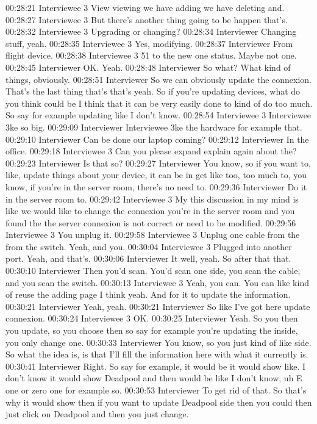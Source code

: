00:28:21 Interviewee 3
View viewing we have adding we have deleting and.
00:28:27 Interviewee 3
But there's another thing going to be happen that's.
00:28:32 Interviewee 3
Upgrading or changing?
00:28:34 Interviewer
Changing stuff, yeah.
00:28:35 Interviewee 3
Yes, modifying.
00:28:37 Interviewer
From flight device.
00:28:38 Interviewee 3
51 to the new one status. Maybe not one.
00:28:45 Interviewer
OK. Yeah.
00:28:48 Interviewer
So what? What kind of things, obviously.
00:28:51 Interviewer
So we can obviously update the connexion. That's the last thing that's that's yeah. So if you're updating devices, what do you think could be I think that it can be very easily done to kind of do too much. So say for example updating like I don't know.
00:28:54 Interviewee 3
Interviewee 3ke so big.
00:29:09 Interviewer
Interviewee 3ke the hardware for example that.
00:29:10 Interviewer
Can be done our laptop coming?
00:29:12 Interviewer
In the office.
00:29:18 Interviewee 3
Can you please expand explain again about the?
00:29:23 Interviewer
Is that so?
00:29:27 Interviewer
You know, so if you want to, like, update things about your device, it can be in get like too, too much to, you know, if you're in the server room, there's no need to.
00:29:36 Interviewer
Do it in the server room to.
00:29:42 Interviewee 3
My this discussion in my mind is like we would like to change the connexion you're in the server room and you found the the server connexion is not correct or need to be modified.
00:29:56 Interviewee 3
You unplug it.
00:29:58 Interviewee 3
Unplug one cable from the from the switch. Yeah, and you.
00:30:04 Interviewee 3
Plugged into another port. Yeah, and that's.
00:30:06 Interviewer
It well, yeah. So after that that.
00:30:10 Interviewer
Then you'd scan. You'd scan one side, you scan the cable, and you scan the switch.
00:30:13 Interviewee 3
Yeah, you can. You can like kind of reuse the adding page I think yeah. And for it to update the information.
00:30:21 Interviewer
Yeah, yeah.
00:30:21 Interviewer
So like I've got here update connexion.
00:30:24 Interviewee 3
OK.
00:30:25 Interviewer
Yeah. So you then you update, so you choose then so say for example you're updating the inside, you only change one.
00:30:33 Interviewer
You know, so you just kind of like side. So what the idea is, is that I'll fill the information here with what it currently is.
00:30:41 Interviewer
Right. So say for example, it would be it would show like. I don't know it would show Deadpool and then would be like I don't know, uh E one or zero one for example so.
00:30:53 Interviewer
To get rid of that. So that's why it would show then if you want to update Deadpool side then you could then just click on Deadpool and then you just change.
